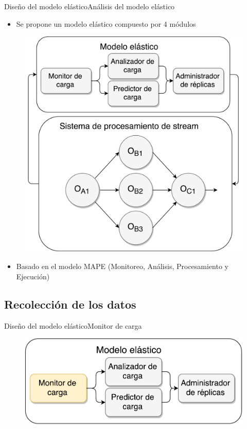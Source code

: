 \begin{frame}{Diseño del modelo elástico}{Análisis del modelo elástico}
\begin{itemize}
	\item Se propone un modelo elástico compuesto por 4 módulos
\end{itemize}
\begin{figure}[ht!]
  \centering
    \includegraphics[scale=0.3]{images/Diagrama.pdf}
\end{figure}
\begin{itemize}
    \item Basado en el modelo MAPE (Monitoreo, Análisis, Procesamiento y Ejecución)
\end{itemize}
\end{frame}

\subsection*{Recolección de los datos}
\begin{frame}{Diseño del modelo elástico}{Monitor de carga}
\begin{figure}
	\includegraphics[scale=0.5]{images/Modelo-vSlides-I.pdf}
\end{figure}
\end{frame}

